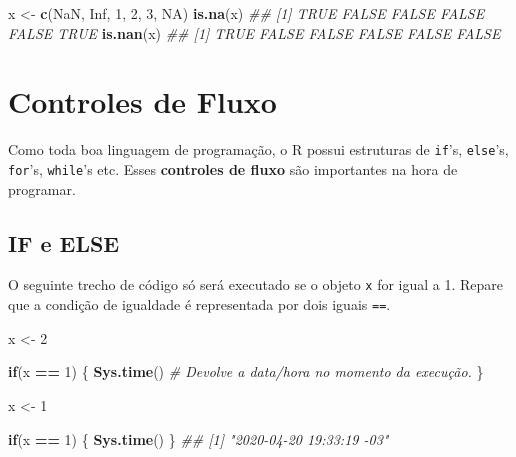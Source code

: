 \documentclass[
]{book}
\newenvironment{Shaded}{\begin{snugshade}}{\end{snugshade}}
\newcommand{\CommentTok}[1]{\textcolor[rgb]{0.56,0.35,0.01}{\textit{#1}}}
\newcommand{\ControlFlowTok}[1]{\textcolor[rgb]{0.13,0.29,0.53}{\textbf{#1}}}
\newcommand{\DecValTok}[1]{\textcolor[rgb]{0.00,0.00,0.81}{#1}}
\newcommand{\KeywordTok}[1]{\textcolor[rgb]{0.13,0.29,0.53}{\textbf{#1}}}
\newcommand{\NormalTok}[1]{#1}
\newcommand{\OperatorTok}[1]{\textcolor[rgb]{0.81,0.36,0.00}{\textbf{#1}}}
\newcommand{\OtherTok}[1]{\textcolor[rgb]{0.56,0.35,0.01}{#1}}
\newcommand{\StringTok}[1]{\textcolor[rgb]{0.31,0.60,0.02}{#1}}
\begin{document}
\begin{Shaded}
\begin{Highlighting}[]
\NormalTok{x <-}\StringTok{ }\KeywordTok{c}\NormalTok{(}\OtherTok{NaN}\NormalTok{, }\OtherTok{Inf}\NormalTok{, }\DecValTok{1}\NormalTok{, }\DecValTok{2}\NormalTok{, }\DecValTok{3}\NormalTok{, }\OtherTok{NA}\NormalTok{)}
\KeywordTok{is.na}\NormalTok{(x)}
\CommentTok{## [1]  TRUE FALSE FALSE FALSE FALSE  TRUE}
\KeywordTok{is.nan}\NormalTok{(x)}
\CommentTok{## [1]  TRUE FALSE FALSE FALSE FALSE FALSE}
\end{Highlighting}
\end{Shaded}

\hypertarget{controles-de-fluxo}{%
\section{Controles de Fluxo}\label{controles-de-fluxo}}

Como toda boa linguagem de programação, o R possui estruturas de \texttt{if}'s, \texttt{else}'s, \texttt{for}'s, \texttt{while}'s etc. Esses \textbf{controles de fluxo} são importantes na hora de programar.

\hypertarget{if-e-else}{%
\subsection{IF e ELSE}\label{if-e-else}}

O seguinte trecho de código só será executado se o objeto \texttt{x} for igual a 1. Repare que a condição de igualdade é representada por dois iguais \texttt{==}.

\begin{Shaded}
\begin{Highlighting}[]
\NormalTok{x <-}\StringTok{ }\DecValTok{2}

\ControlFlowTok{if}\NormalTok{(x }\OperatorTok{==}\StringTok{ }\DecValTok{1}\NormalTok{) \{         }
  \KeywordTok{Sys.time}\NormalTok{()      }\CommentTok{# Devolve a data/hora no momento da execução.}
\NormalTok{\}}
\end{Highlighting}
\end{Shaded}

\begin{Shaded}
\begin{Highlighting}[]
\NormalTok{x <-}\StringTok{ }\DecValTok{1}

\ControlFlowTok{if}\NormalTok{(x }\OperatorTok{==}\StringTok{ }\DecValTok{1}\NormalTok{) \{}
  \KeywordTok{Sys.time}\NormalTok{()}
\NormalTok{\}}
\CommentTok{## [1] "2020-04-20 19:33:19 -03"}
\end{Highlighting}
\end{Shaded}
\end{document}
